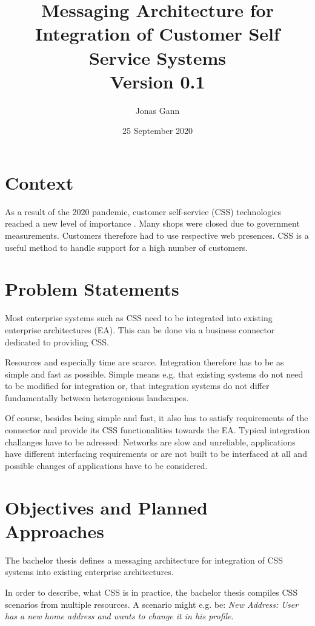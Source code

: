 \documentclass{article}
\title{Messaging Architecture for Integration of Customer Self Service Systems \\ Version 0.1}
\author{Jonas Gann}
\date{25 September 2020}
\begin{document}
\maketitle

\section{Context}

As a result of the 2020 pandemic, customer self-service (CSS) technologies reached a new level of importance \cite{covid}.
Many shops were closed due to government measurements. Customers therefore had to use respective web
presences. CSS is a useful method to handle support for a high number of customers.

\section{Problem Statements}

Most enterprise systems such as CSS need to be integrated into existing enterprise architectures (EA).
This can be done via a business connector dedicated to providing CSS.

Resources and especially time are scarce. Integration therefore has to be as simple and fast as possible.
Simple means e.g. that existing systems do not need to be modified for integration or, 
that integration systems do not differ fundamentally between heterogenious landscapes.

Of course, besides being simple and fast, it also has to satisfy requirements of the connector 
and provide its CSS functionalities towards the EA. Typical integration challanges have to be adressed: 
Networks are slow and unreliable, applications have different interfacing requirements or are not 
built to be interfaced at all and possible changes of applications have to be considered. 

\section{Objectives and Planned Approaches}

The bachelor thesis defines a messaging architecture for integration of CSS systems into existing enterprise
architectures.

In order to describe, what CSS is in practice, the bachelor thesis compiles CSS scenarios from multiple
resources. A scenario might e.g. be: \textit{New Address: User has a new home address and wants to change it in his profile}.
\end{document}
